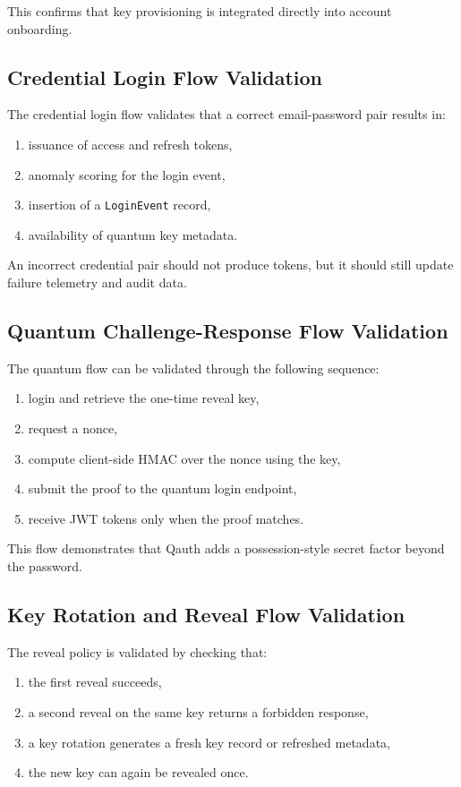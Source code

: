 \documentclass[12pt,a4paper]{report}
\begin{document}
This confirms that key provisioning is integrated directly into account onboarding.

\subsection{Credential Login Flow Validation}
The credential login flow validates that a correct email-password pair results in:

\begin{enumerate}
    \item issuance of access and refresh tokens,
    \item anomaly scoring for the login event,
    \item insertion of a \texttt{LoginEvent} record,
    \item availability of quantum key metadata.
\end{enumerate}

An incorrect credential pair should not produce tokens, but it should still update failure telemetry and audit data.

\subsection{Quantum Challenge-Response Flow Validation}
The quantum flow can be validated through the following sequence:

\begin{enumerate}
    \item login and retrieve the one-time reveal key,
    \item request a nonce,
    \item compute client-side HMAC over the nonce using the key,
    \item submit the proof to the quantum login endpoint,
    \item receive JWT tokens only when the proof matches.
\end{enumerate}

This flow demonstrates that Qauth adds a possession-style secret factor beyond the password.

\subsection{Key Rotation and Reveal Flow Validation}
The reveal policy is validated by checking that:

\begin{enumerate}
    \item the first reveal succeeds,
    \item a second reveal on the same key returns a forbidden response,
    \item a key rotation generates a fresh key record or refreshed metadata,
    \item the new key can again be revealed once.
\end{enumerate}
\end{document}

